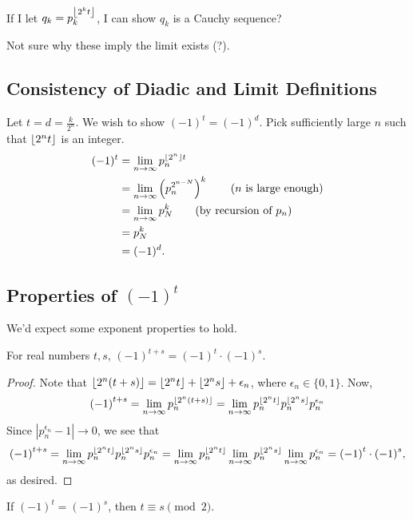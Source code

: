 \documentclass[notes]{subfile}
\begin{document}
If I let $q_k = p_k^{\left \lfloor{2^kt}\right \rfloor}$, I can show $q_k$ is
a Cauchy sequence?

Not sure why these imply the limit exists (?).

\subsection{Consistency of Diadic and Limit Definitions}

Let $t = d = \frac{k}{2^n}$.
We wish to show $(-1)^t = (-1)^d$.
Pick sufficiently large $n$ such that $\left \lfloor{2^n t}\right \rfloor$ is
an integer.
\begin{align*}
    (-1)^t &= \lim_{n \to \infty} p_n^{\left \lfloor{2^n}\right \rfloor t} \\
    &= \lim_{n \to \infty} \left( p_n^{2^{n-N}} \right)^k 
    \tag{$n$ is large enough}\\
    &= \lim_{n \to \infty} p_N^k 
    \tag{by recursion of $p_n$}\\
    &= p_N^k \\
    &= (-1)^d.
\end{align*}

\subsection{Properties of $(-1)^t$}

We'd expect some exponent properties to hold.

\begin{theorem}
    For real numbers $t,s$, ${(-1)}^{t+s} = {(-1)}^{t}\cdot {(-1)}^{s}$.
\end{theorem}

\begin{proof}
    Note that $\left \lfloor{2^n(t+s)}\right \rfloor = \left \lfloor{2^n t}\right \rfloor + \left \lfloor{2^n s}\right \rfloor + \epsilon_n$, 
    where $\epsilon_n \in \{0,1\}$.
    Now,
    \[ {(-1)}^{t+s} = \lim_{n \to \infty} p_n^{\left \lfloor{2^n(t+s)}\right \rfloor} = \lim_{n \to \infty} p_n^{\left \lfloor{2^n t}\right \rfloor} p_n^{\left \lfloor{2^n s}\right \rfloor} p_n^{\epsilon_n} \]
    Since $|p_n^{\epsilon_n} -1| \to 0$, we see that
    \[ {(-1)}^{t+s} = \lim_{n \to \infty} p_n^{\left \lfloor{2^n t}\right \rfloor} p_n^{\left \lfloor{2^n s}\right \rfloor} p_n^{\epsilon_n} = \lim_{n \to \infty} p_n^{\left \lfloor{2^n t}\right \rfloor}  \lim_{n \to \infty} p_n^{\left \lfloor{2^n s}\right \rfloor} \lim_{n \to \infty} p_n^{\epsilon_n} = {(-1)}^{t}\cdot {(-1)}^{s}, \]
    as desired.
\end{proof}

\begin{theorem}
    If $(-1)^t = (-1)^s$, then $t \equiv s \pmod{2}$.
\end{theorem}
\end{document}

